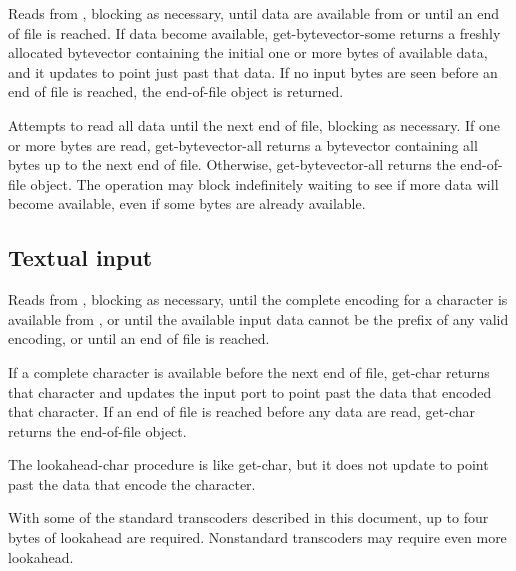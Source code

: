\begin{entry}{%
}
   
Reads from , blocking as necessary, until data are
available from  or until an end of file is reached.
If data become available,
{\cf get-bytevector-some} returns a freshly allocated
bytevector containing the initial one or more bytes of available
data, and it updates  to point just past that data.
If no input bytes are seen before an end
of file is reached, the end-of-file object is returned.
\end{entry}

\begin{entry}{%
}
   
Attempts to read all data until the next end of file, blocking as
necessary. If one or more bytes are read, {\cf get-bytevector-all} returns
a bytevector
containing all bytes up to the next end of file.  Otherwise, {\cf
  get-bytevector-all} returns the end-of-file object.
The operation may block indefinitely waiting to see if more data
will become available, even if some bytes are already available.
\end{entry}

\subsection{Textual input}

\begin{entry}{%
}
   
Reads from , blocking as necessary, until the
complete encoding for a character is available from ,
or until the available input data cannot be the prefix of any valid encoding,
or until an end of file is reached.

If a complete character is available before the next end of file, {\cf
  get-char} returns that character and updates the input port to
point past the data that encoded that character. If an end of file is
reached before any data are read, {\cf get-char} returns the
end-of-file object.
\end{entry}

\begin{entry}{%
}
  
The {\cf lookahead-char} procedure is like {\cf get-char}, but it does not 
update  to point past the data
that encode the character.

\begin{note}
  With some of the standard transcoders
  described in this document, up to four bytes of lookahead are
  required. Nonstandard transcoders may require even more lookahead.
\end{note}
\end{entry}

